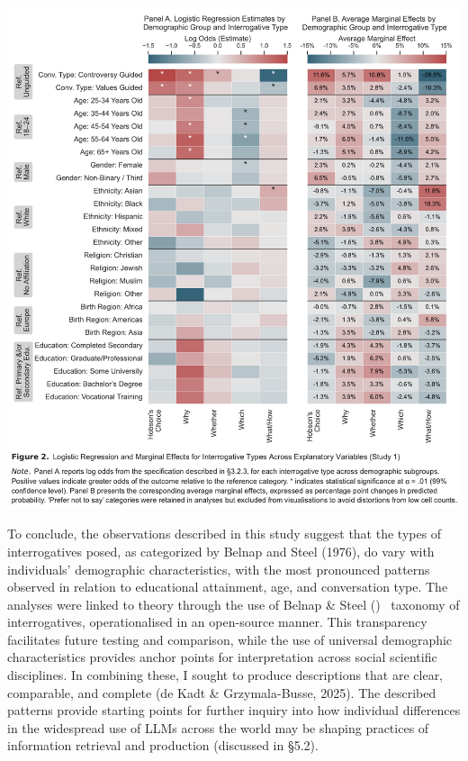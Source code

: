 \documentclass[
  12pt,
]{article}
\begin{document}
\begin{center}\includegraphics{../03_outputs/02_descriptive_analyses/figure_2} \end{center}

To conclude, the observations described in this study suggest that the types of interrogatives posed, as categorized by Belnap and Steel (1976), do vary with individuals' demographic characteristics, with the most pronounced patterns observed in relation to educational attainment, age, and conversation type. The analyses were linked to theory through the use of Belnap \& Steel () ~taxonomy of interrogatives, operationalised in an open-source manner. This transparency facilitates future testing and comparison, while the use of universal demographic characteristics provides anchor points for interpretation across social scientific disciplines. In combining these, I sought to produce descriptions that are clear, comparable, and complete (de Kadt \& Grzymala-Busse, 2025). The described patterns provide starting points for further inquiry into how individual differences in the widespread use of LLMs across the world may be shaping practices of information retrieval and production (discussed in §5.2).
\end{document}
